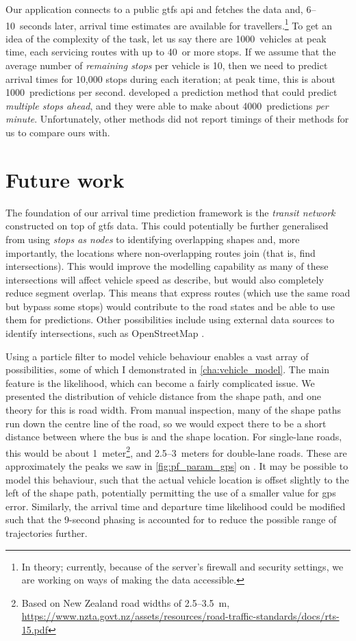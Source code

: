 Our application connects to a public \gls{gtfs} \gls{api} and fetches the data and, 6--10~seconds later, arrival time estimates are available for travellers.\footnote{In theory; currently, because of the server's firewall and security settings, we are working on ways of making the data accessible.} To get an idea of the complexity of the task, let us say there are 1000~vehicles at peak time, each servicing routes with up to 40~or more stops. If we assume that the average number of \emph{remaining stops} per vehicle is 10, then we need to predict arrival times for 10,000 stops during each iteration; at peak time, this is about 1000~predictions per second. \citet{Chang_2010} developed a prediction method that could predict \emph{multiple stops ahead}, and they were able to make about 4000~predictions \emph{per minute}. Unfortunately, other methods did not report timings of their methods for us to compare ours with.


\section{Future work}

The foundation of our arrival time prediction framework is the \emph{transit network} constructed on top of \gls{gtfs} data. This could potentially be further generalised from using \emph{stops as nodes} to identifying overlapping shapes and, more importantly, the locations where non-overlapping routes join (that is, find intersections). This would improve the modelling capability as many of these intersections will affect vehicle speed as \citet{Celan_2017} describe, but would also completely reduce segment overlap. This means that express routes (which use the same road but bypass some stops) would contribute to the road states and be able to use them for predictions. Other possibilities include using external data sources to identify intersections, such as OpenStreetMap \citep{OpenStreetMap_2017}.


Using a particle filter to model vehicle behaviour enables a vast array of possibilities, some of which I demonstrated in \cref{cha:vehicle_model}. The main feature is the likelihood, which can become a fairly complicated issue. We presented the distribution of vehicle distance from the shape path, and one theory for this is road width. From manual inspection, many of the shape paths run down the centre line of the road, so we would expect there to be a short distance between where the bus is and the shape location. For single-lane roads, this would be about 1~meter\footnote{Based on New Zealand road widths of 2.5--3.5~m, \url{https://www.nzta.govt.nz/assets/resources/road-traffic-standards/docs/rts-15.pdf}}, and 2.5--3~meters for double-lane roads. These are approximately the peaks we saw in \cref{fig:pf_param_gps} on . It may be possible to model this behaviour, such that the actual vehicle location is offset slightly to the left of the shape path, potentially permitting the use of a smaller value for \gls{gps} error. Similarly, the arrival time and departure time likelihood could be modified such that the 9-second phasing is accounted for to reduce the possible range of trajectories further.


